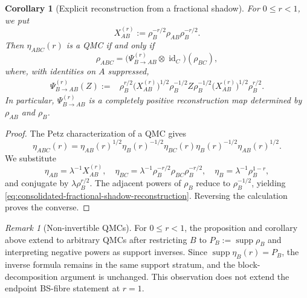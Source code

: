 \documentclass[11pt]{article}
\newtheorem{corollary}[corollary]{Corollary}
\theoremstyle{remark}
\newtheorem{remark}[remark]{Remark}
\DeclareMathOperator{\id}{id}
\newcommand{\1}{\mathbbm{1}}
\begin{document}
\begin{corollary}[Explicit reconstruction from a fractional shadow]
\label{cor:consolidated-fractional-shadow-reconstruction}
For $0\leq r<1$, we put
\begin{equation}
 X_{AB}^{(r)}:=
 \rho_B^{-r/2}\rho_{AB}\rho_B^{-r/2}.
\end{equation}
Then $\eta_{ABC}(r)$ is a QMC if and only if
\begin{equation}
 \rho_{ABC}
 =\bigl(\Psi_{B\to AB}^{(r)}\otimes\id_C\bigr)(\rho_{BC}),
 \label{eq:consolidated-fractional-shadow-reconstruction}
\end{equation}
where, with identities on $A$ suppressed,
\begin{align}
 \Psi_{B\to AB}^{(r)}(Z)
 :={}&\rho_B^{r/2}\bigl(X_{AB}^{(r)}\bigr)^{1/2}
 \rho_B^{-1/2}Z\rho_B^{-1/2}
 \bigl(X_{AB}^{(r)}\bigr)^{1/2}\rho_B^{r/2}.
 \label{eq:consolidated-fractional-shadow-map}
\end{align}
In particular, $\Psi_{B\to AB}^{(r)}$ is a completely positive
reconstruction map determined by $\rho_{AB}$ and $\rho_B$.
\end{corollary}

\begin{proof}
The Petz characterization of a QMC
\cite[Eqs.~(10)--(11)]{hayden-2004} gives
\begin{equation}
 \eta_{ABC}(r)=\eta_{AB}(r)^{1/2}\eta_B(r)^{-1/2}
 \eta_{BC}(r)\eta_B(r)^{-1/2}\eta_{AB}(r)^{1/2}.
\end{equation}
We substitute
\begin{equation}
 \eta_{AB}=\lambda^{-1}X_{AB}^{(r)},\quad
 \eta_{BC}=\lambda^{-1}\rho_B^{-r/2}\rho_{BC}\rho_B^{-r/2},
 \quad
 \eta_B=\lambda^{-1}\rho_B^{1-r},
\end{equation}
and conjugate by $\lambda\rho_B^{r/2}$.  The adjacent powers of
$\rho_B$ reduce to $\rho_B^{-1/2}$, yielding
\eqref{eq:consolidated-fractional-shadow-reconstruction}.  Reversing
the calculation proves the converse.
\end{proof}

\begin{remark}[Non-invertible QMCs]
For $0\leq r<1$, the proposition and corollary above extend to
arbitrary QMCs after restricting $B$ to
$P_B:=\operatorname{supp}\rho_B$ and interpreting negative powers as
support inverses.  Since
$\operatorname{supp}\eta_B(r)=P_B$, the inverse formula remains in
the same support stratum, and the block-decomposition argument is
unchanged.  This observation does not extend the endpoint BS-fibre
statement at $r=1$.
\end{remark}
\end{document}

